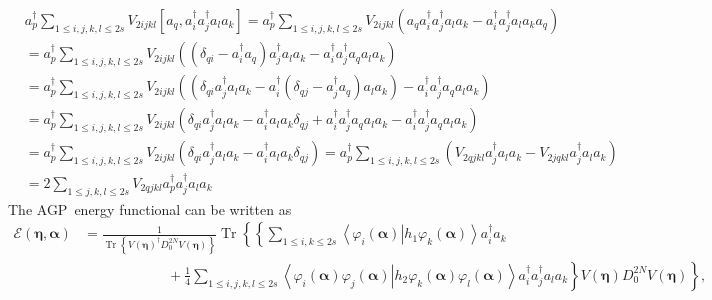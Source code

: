 \documentclass[aps,preprint]{revtex4}%
\begin{document}
\begin{align}
&  a_{p}^{\dagger}\sum_{1\leq i,j,k,l\leq2s}V_{2ijkl}\left[  a_{q}%
,a_{i}^{\dagger}a_{j}^{\dagger}a_{l}a_{k}\right]  =a_{p}^{\dagger}\sum_{1\leq
i,j,k,l\leq2s}V_{2ijkl}\left(  a_{q}a_{i}^{\dagger}a_{j}^{\dagger}a_{l}%
a_{k}-a_{i}^{\dagger}a_{j}^{\dagger}a_{l}a_{k}a_{q}\right) \nonumber\\
&  =a_{p}^{\dagger}\sum_{1\leq i,j,k,l\leq2s}V_{2ijkl}\left(  \left(
\delta_{qi}-a_{i}^{\dagger}a_{q}\right)  a_{j}^{\dagger}a_{l}a_{k}%
-a_{i}^{\dagger}a_{j}^{\dagger}a_{q}a_{l}a_{k}\right) \nonumber\\
&  =a_{p}^{\dagger}\sum_{1\leq i,j,k,l\leq2s}V_{2ijkl}\left(  \left(
\delta_{qi}a_{j}^{\dagger}a_{l}a_{k}-a_{i}^{\dagger}\left(  \delta_{qj}%
-a_{j}^{\dagger}a_{q}\right)  a_{l}a_{k}\right)  -a_{i}^{\dagger}%
a_{j}^{\dagger}a_{q}a_{l}a_{k}\right) \nonumber\\
&  =a_{p}^{\dagger}\sum_{1\leq i,j,k,l\leq2s}V_{2ijkl}\left(  \delta_{qi}%
a_{j}^{\dagger}a_{l}a_{k}-a_{i}^{\dagger}a_{l}a_{k}\delta_{qj}+a_{i}^{\dagger
}a_{j}^{\dagger}a_{q}a_{l}a_{k}-a_{i}^{\dagger}a_{j}^{\dagger}a_{q}a_{l}%
a_{k}\right) \nonumber\\
&  =a_{p}^{\dagger}\sum_{1\leq i,j,k,l\leq2s}V_{2ijkl}\left(  \delta_{qi}%
a_{j}^{\dagger}a_{l}a_{k}-a_{i}^{\dagger}a_{l}a_{k}\delta_{qj}\right)
=a_{p}^{\dagger}\sum_{1\leq i,j,k,l\leq2s}\left(  V_{2qjkl}a_{j}^{\dagger
}a_{l}a_{k}-V_{2jqkl}a_{j}^{\dagger}a_{l}a_{k}\right) \nonumber\\
&  =2\sum_{1\leq j,k,l\leq2s}V_{2qjkl}a_{p}^{\dagger}a_{j}^{\dagger}a_{l}a_{k}%
\end{align}
The AGP\ energy functional can be written as
\begin{align}
\mathcal{E}\left(  \mathbf{\eta,\alpha}\right)   &  =\frac{1}%
{\operatorname{Tr}\left\{  V\left(  \mathbf{\eta}\right)  ^{\dagger}D_{0}%
^{2N}V\left(  \mathbf{\eta}\right)  \right\}  }\operatorname{Tr}\left\{
\left\{  \sum_{1\leq i,k\leq2s}\left\langle \left.  \varphi_{i}\left(
\mathbf{\alpha}\right)  \right\vert h_{1}\varphi_{k}\left(  \mathbf{\alpha
}\right)  \right\rangle a_{i}^{\dagger}a_{k}\right.  \right. \nonumber\\
&  \qquad\qquad\qquad+\left.  \left.  \frac{1}{4}\sum_{1\leq i,j,k,l\leq
2s}\left\langle \left.  \varphi_{i}\left(  \mathbf{\alpha}\right)  \varphi
_{j}\left(  \mathbf{\alpha}\right)  \right\vert h_{2}\varphi_{k}\left(
\mathbf{\alpha}\right)  \varphi_{l}\left(  \mathbf{\alpha}\right)
\right\rangle a_{i}^{\dagger}a_{j}^{\dagger}a_{l}a_{k}\right\}  V\left(
\mathbf{\eta}\right)  D_{0}^{2N}V\left(  \mathbf{\eta}\right)  \right\}  ,
\label{agpen1}%
\end{align}
\end{document}

